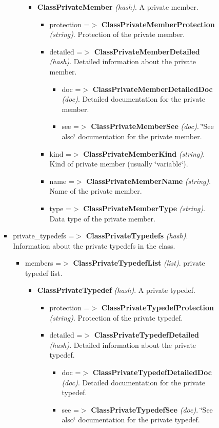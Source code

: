 \begin{itemize}
\begin{itemize}
\begin{itemize}
\begin{itemize}
\begin{itemize}
\begin{itemize}
\item {\bf ClassPrivateMember} {\em (hash)\/}. A private member. \begin{itemize}
\item protection =$>$ {\bf ClassPrivateMemberProtection} {\em (string)\/}. Protection of the private member. \item detailed =$>$ {\bf ClassPrivateMemberDetailed} {\em (hash)\/}. Detailed information about the private member. \begin{itemize}
\item doc =$>$ {\bf ClassPrivateMemberDetailedDoc} {\em (doc)\/}. Detailed documentation for the private member. \item see =$>$ {\bf ClassPrivateMemberSee} {\em (doc)\/}. \char`\"{}See also\char`\"{} documentation for the private member. \end{itemize}
\item kind =$>$ {\bf ClassPrivateMemberKind} {\em (string)\/}. Kind of private member (usually \char`\"{}variable\char`\"{}). \item name =$>$ {\bf ClassPrivateMemberName} {\em (string)\/}. Name of the private member. \item type =$>$ {\bf ClassPrivateMemberType} {\em (string)\/}. Data type of the private member. \end{itemize}
\end{itemize}
\end{itemize}
\item private\_\-typedefs =$>$ {\bf ClassPrivateTypedefs} {\em (hash)\/}. Information about the private typedefs in the class. \begin{itemize}
\item members =$>$ {\bf ClassPrivateTypedefList} {\em (list)\/}. private typedef list. \begin{itemize}
\item {\bf ClassPrivateTypedef} {\em (hash)\/}. A private typedef. \begin{itemize}
\item protection =$>$ {\bf ClassPrivateTypedefProtection} {\em (string)\/}. Protection of the private typedef. \item detailed =$>$ {\bf ClassPrivateTypedefDetailed} {\em (hash)\/}. Detailed information about the private typedef. \begin{itemize}
\item doc =$>$ {\bf ClassPrivateTypedefDetailedDoc} {\em (doc)\/}. Detailed documentation for the private typedef. \item see =$>$ {\bf ClassPrivateTypedefSee} {\em (doc)\/}. \char`\"{}See also\char`\"{} documentation for the private typedef. \end{itemize}

\end{itemize}
\end{itemize}
\end{itemize}
\end{itemize}
\end{itemize}
\end{itemize}
\end{itemize}
